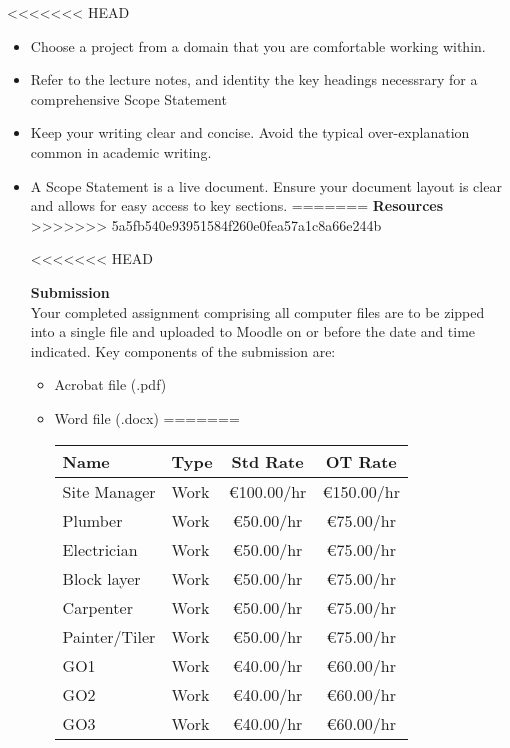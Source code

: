 <<<<<<< HEAD
\begin{itemize}
	\item Choose a project from a domain that you are comfortable working within.  
	\item Refer to the lecture notes, and identity the key headings necessrary for a comprehensive Scope Statement
	\item Keep your writing clear and concise.  Avoid the typical over-explanation common in academic writing.
	\item A Scope Statement is a live document.  Ensure your document layout is clear and allows for easy access to key sections. 
=======
\newpage
\large\textbf{Resources}\\
\vspace{.25cm}
>>>>>>> 5a5fb540e93951584f260e0fea57a1c8a66e244b


<<<<<<< HEAD

\textbf{Submission}\\
Your completed assignment comprising all computer files are to be zipped into a single file and uploaded to Moodle on or before the date and time indicated.  Key components of the submission are:
\begin{itemize}
	\item Acrobat file (.pdf)
	\item Word file (.docx)
=======
\begin{tabular}{|l|l|c|c|}
	\hline 
	\textbf{Name} & \textbf{Type} & \textbf{Std Rate} & \textbf{OT Rat}e \\ 
	\hline 
	Site Manager	& Work	& \euro100.00/hr & 	\euro150.00/hr\\
	Plumber			& Work	& \euro50.00/hr	& \euro75.00/hr\\
	Electrician		& Work	& \euro50.00/hr	& \euro75.00/hr\\
	Block layer		& Work	& \euro50.00/hr	& \euro75.00/hr\\
	Carpenter		& Work	& \euro50.00/hr	& \euro75.00/hr\\
	Painter/Tiler	& Work	& \euro50.00/hr	& \euro75.00/hr\\
	GO1				& Work	& \euro40.00/hr	& \euro60.00/hr\\
	GO2				& Work	& \euro40.00/hr	& \euro60.00/hr\\
	GO3				& Work	& \euro40.00/hr	& \euro60.00/hr\\
	\hline
\end{tabular} 



\vspace{.5cm}


\end{itemize}
\end{itemize}
